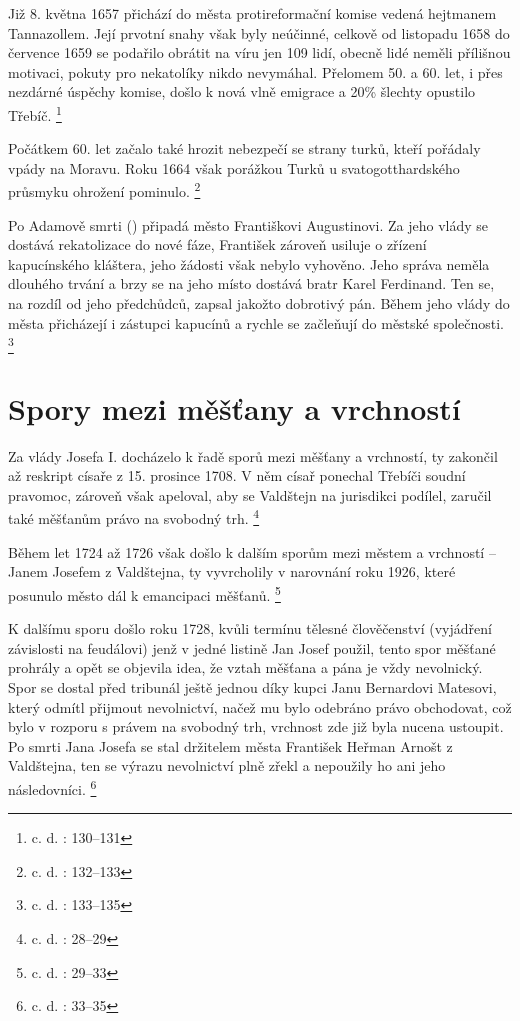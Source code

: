 \documentclass[a4paper,oneside,12p]{report}
\begin{document}
Již 8. května 1657 přichází do města protireformační komise vedená hejtmanem Tannazollem.
Její prvotní snahy však byly neúčinné, celkově od listopadu 1658 do července 1659 se podařilo obrátit na  víru jen 109 lidí, obecně lidé neměli přílišnou motivaci, pokuty pro nekatolíky nikdo nevymáhal.
Přelomem 50. a 60. let, i přes nezdárné úspěchy komise, došlo k nová vlně emigrace a 20\% šlechty opustilo Třebíč. \footnote{c. d. : 130--131}

Počátkem 60. let začalo také hrozit nebezpečí se strany turků, kteří pořádaly vpády na Moravu.
Roku 1664 však porážkou Turků u svatogotthardského průsmyku ohrožení pominulo. \footnote{c. d. : 132--133}

Po Adamově smrti () připadá město Františkovi Augustinovi.
Za jeho vlády se dostává rekatolizace do nové fáze, František zároveň usiluje o zřízení kapucínského kláštera, jeho žádosti však nebylo vyhověno.
Jeho správa neměla dlouhého trvání a brzy se na jeho místo dostává bratr Karel Ferdinand.
Ten se, na rozdíl od jeho předchůdců, zapsal jakožto dobrotivý pán.
Během jeho vlády do města přicházejí i zástupci kapucínů a rychle se začleňují do městské společnosti. \footnote{c. d. : 133--135}

\section{Spory mezi měšťany a vrchností}

Za vlády Josefa I. docházelo k řadě sporů mezi měšťany a vrchností, ty zakončil až reskript císaře z 15. prosince 1708.
V něm císař ponechal Třebíči soudní pravomoc, zároveň však apeloval, aby se Valdštejn na jurisdikci podílel, zaručil také měšťanům právo na svobodný trh. \footnote{c. d. : 28--29}

Během let 1724 až 1726 však došlo k dalším sporům mezi městem a vrchností -- Janem Josefem z Valdštejna, ty vyvrcholily v narovnání roku 1926, které posunulo město dál k emancipaci měšťanů. \footnote{c. d. : 29--33}

K dalšímu sporu došlo roku 1728, kvůli termínu tělesné člověčenství (vyjádření závislosti na feudálovi) jenž v jedné listině Jan Josef použil, tento spor měšťané prohrály a opět se objevila idea, že vztah měšťana a pána je vždy nevolnický.
Spor se dostal před tribunál ještě jednou díky kupci Janu Bernardovi Matesovi, který odmítl přijmout nevolnictví, načež mu bylo odebráno právo obchodovat, což bylo v rozporu s právem na svobodný trh, vrchnost zde již byla nucena ustoupit.
Po smrti Jana Josefa se stal držitelem města František Heřman Arnošt z Valdštejna, ten se výrazu nevolnictví plně zřekl a nepoužily ho ani jeho následovníci. \footnote{c. d. : 33--35}
\end{document}
